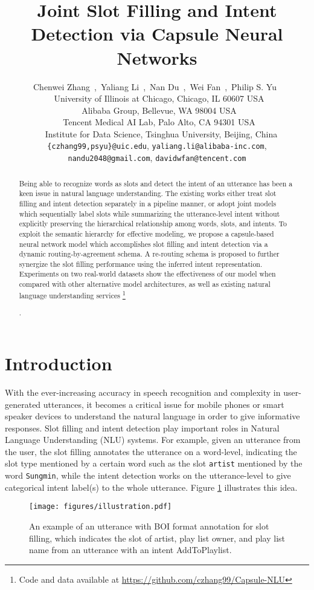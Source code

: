 \documentclass[11pt,a4paper,hyphens]{article}
\title{Joint Slot Filling and Intent Detection via Capsule Neural Networks}
\author{Chenwei Zhang\footnotemark[2]~,~Yaliang Li\footnotemark[4]~,~Nan Du\footnotemark[3]~,~Wei Fan\footnotemark[3]~,~Philip S. Yu\footnotemark[2]~\footnotemark[5]\\
  \footnotemark[2]~University of Illinois at Chicago, Chicago, IL 60607 USA\\
  \footnotemark[4]~Alibaba Group, Bellevue, WA 98004 USA\\
  \footnotemark[3]~Tencent Medical AI Lab, Palo Alto, CA 94301 USA\\
  \footnotemark[5]~~Institute for Data Science, Tsinghua University, Beijing, China\\
  {\tt \{czhang99,psyu\}@uic.edu}, {\tt yaliang.li@alibaba-inc.com},\\
  {\tt nandu2048@gmail.com}, {\tt davidwfan@tencent.com}\\
  }
\date{}
\newcommand\blfootnote[1]{\begingroup
  \renewcommand\thefootnote{}\footnote{#1}\addtocounter{footnote}{-1}\endgroup
}
\begin{document}
\maketitle
\begin{abstract}
Being able to recognize words as slots and detect the intent of an utterance has been a keen issue in natural language understanding. The existing works either treat slot filling and intent detection separately in a pipeline manner, or adopt joint models which sequentially label slots while summarizing the utterance-level intent without explicitly preserving the hierarchical relationship among words, slots, and intents. To exploit the semantic hierarchy for effective modeling, we propose a capsule-based neural network model which accomplishes slot filling and intent detection via a dynamic routing-by-agreement schema. A re-routing schema is proposed to further synergize the slot filling performance using the inferred intent representation. Experiments on two real-world datasets show the effectiveness of our model when compared with other alternative model architectures, as well as existing natural language understanding services\blfootnote{Code and data available at \url{https://github.com/czhang99/Capsule-NLU}}.
\end{abstract}

\section{Introduction}
With the ever-increasing accuracy in speech recognition and complexity in user-generated utterances, it becomes a critical issue for mobile phones or smart speaker devices to understand the natural language in order to give informative responses. Slot filling and intent detection play important roles in Natural Language Understanding (NLU) systems.
For example, given an utterance from the user, the slot filling annotates the utterance on a word-level, indicating the slot type mentioned by a certain word such as the slot \texttt{artist} mentioned by the word \texttt{Sungmin}, while the intent detection works on the utterance-level to give categorical intent label(s) to the whole utterance. Figure \ref{fig::illustration} illustrates this idea.
\begin{figure}[htbp]
    \centering
    \texttt{[image: figures/illustration.pdf]}
    \vspace{0.01in}
    \caption{An example of an utterance with BOI format annotation for slot filling, which indicates the slot of artist, play list owner, and play list name from an utterance with an intent AddToPlaylist.}\label{fig::illustration}
\end{figure}
\end{document}
